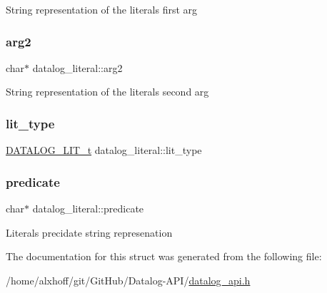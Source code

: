 String representation of the literals first arg \mbox{\label{structdatalog__literal_a38e9dc36488ad4014bfb52027cc65cc9}} 
\subsubsection{\texorpdfstring{arg2}{arg2}}
{\footnotesize\ttfamily char$\ast$ datalog\+\_\+literal\+::arg2}

String representation of the literals second arg \mbox{\label{structdatalog__literal_a7fad52c17a15a69937de4e78746be12c}} 
\subsubsection{\texorpdfstring{lit\+\_\+type}{lit\_type}}
{\footnotesize\ttfamily \hyperlink{datalog__api_8h_ad27ac7b01e9690a8c6d1bd37e131a421}{D\+A\+T\+A\+L\+O\+G\+\_\+\+L\+I\+T\+\_\+t} datalog\+\_\+literal\+::lit\+\_\+type}

\mbox{\label{structdatalog__literal_aad44475a0e606d9fd9c5e7aae3667412}} 
\subsubsection{\texorpdfstring{predicate}{predicate}}
{\footnotesize\ttfamily char$\ast$ datalog\+\_\+literal\+::predicate}

Literal\textquotesingle{}s precidate string represenation 

The documentation for this struct was generated from the following file\+:\begin{DoxyCompactItemize}
\item 
/home/alxhoff/git/\+Git\+Hub/\+Datalog-\/\+A\+P\+I/\hyperlink{datalog__api_8h}{datalog\+\_\+api.\+h}\end{DoxyCompactItemize}
